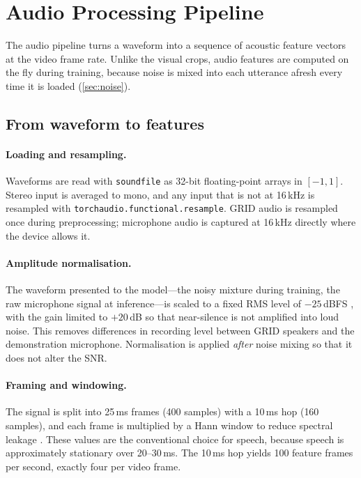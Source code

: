 \section{Audio Processing Pipeline}
\label{sec:audio}

The audio pipeline turns a waveform into a sequence of acoustic feature
vectors at the video frame rate. Unlike the visual crops, audio features are
computed on the fly during training, because noise is mixed into each
utterance afresh every time it is loaded (\cref{sec:noise}).

\subsection{From waveform to features}
\paragraph{Loading and resampling.} Waveforms are read with \texttt{soundfile}
as 32-bit floating-point arrays in $[-1,1]$. Stereo input is averaged to mono,
and any input that is not at 16\,kHz is resampled with
\texttt{torchaudio.functional.resample}. GRID audio is resampled once during
preprocessing; microphone audio is captured at 16\,kHz directly where the
device allows it.

\paragraph{Amplitude normalisation.} The waveform presented to the model---the
noisy mixture during training, the raw microphone signal at inference---is
scaled to a fixed RMS level of $-25$\,dBFS \rec, with the gain limited to
$+20$\,dB so that near-silence is not amplified into loud noise. This removes
differences in recording level between GRID speakers and the demonstration
microphone. Normalisation is applied \emph{after} noise mixing so that it
does not alter the SNR.

\paragraph{Framing and windowing.} The signal is split into 25\,ms frames
(400 samples) with a 10\,ms hop (160 samples), and each frame is multiplied by a
Hann window to reduce spectral leakage \rec. These values are the conventional
choice for speech, because speech is approximately stationary over 20--30\,ms.
The 10\,ms hop yields 100 feature frames per second, exactly four per video
frame.

